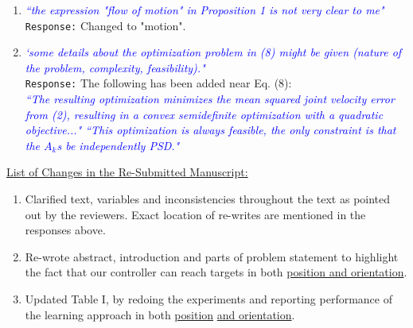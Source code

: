 \documentclass{article}
\begin{document}
\begin{enumerate}
\item \textcolor{blue}{\textit{``the expression "flow of motion" in Proposition 1 is not very clear to me"}}\\
\texttt{Response:}  Changed to "motion".\\

\item \textcolor{blue}{\textit{`some details about the optimization problem in (8) might be given
(nature of the problem, complexity, feasibility)."}}\\
\texttt{Response:} The following has been added near Eq. (8):\\
\textcolor{blue}{\small \textit{``The resulting optimization minimizes the mean squared joint velocity error from (2), resulting in a convex semidefinite optimization with a quadratic objective..." ``This optimization is always feasible, the only constraint is that the $A_k$s be independently PSD."}}\\

\end{enumerate}

\underline{List of Changes in the Re-Submitted Manuscript:}
\begin{enumerate}
\item Clarified text, variables and inconsistencies throughout the text as pointed out by the reviewers. Exact location of re-writes are mentioned in the responses above.
\item Re-wrote abstract, introduction and parts of problem statement to highlight the fact that our controller can reach targets in both \underline{position and orientation}.
\item Updated Table I, by redoing the experiments and reporting performance of the learning approach in both \underline{position} \underline{and orientation}.
\end{enumerate}





\end{document}

